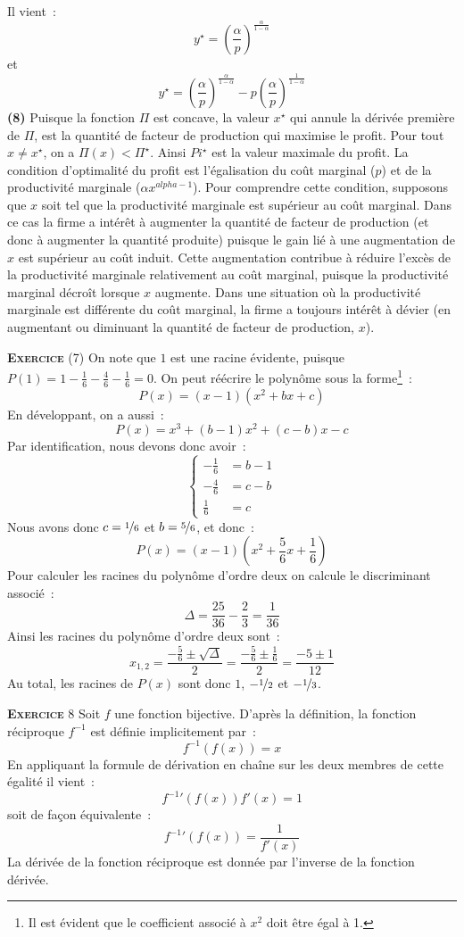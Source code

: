 \documentclass[10pt,a4paper,notitlepage]{article}
\newcommand{\exercice}[1]{\textsc{\textbf{Exercice}} #1}
\begin{document}
Il vient :
\[
y^{\star} = \left(\frac{\alpha}{p}\right)^{\frac{\alpha}{1-\alpha}}
\]
et
\[
y^{\star} = \left(\frac{\alpha}{p}\right)^{\frac{\alpha}{1-\alpha}}-p\left(\frac{\alpha}{p}\right)^{\frac{1}{1-\alpha}}
\]
\textbf{(8)} Puisque la fonction $\Pi$ est concave, la valeur
$x^{\star}$ qui annule la dérivée première de $\Pi$, est la quantité
de facteur de production qui maximise le profit. Pour tout $x\neq
x^{\star}$, on a $\Pi(x)<\Pi^{\star}$. Ainsi $Pi^{\star}$ est
la valeur maximale du profit. La condition d'optimalité du profit est
l'égalisation du coût marginal ($p$) et de la productivité marginale
($\alpha x^{alpha-1}$). Pour comprendre cette condition, supposons que
$x$ soit tel que la productivité marginale est supérieur au coût
marginal. Dans ce cas la firme a intérêt à augmenter la quantité de
facteur de production (et donc à augmenter la quantité produite)
puisque le gain lié à une augmentation de $x$ est supérieur au coût
induit. Cette augmentation contribue à réduire l'excès de la
productivité marginale relativement au coût marginal, puisque la
productivité marginal décroît lorsque $x$ augmente. Dans une situation
où la productivité marginale est différente du coût marginal, la firme
a toujours intérêt à dévier (en augmentant ou diminuant la quantité de
facteur de production, $x$).

\bigskip

\exercice{(7)} On note que $1$ est une racine évidente, puisque $P(1)=1-\frac{1}{6}-\frac{4}{6}-\frac{1}{6}=0$. On peut réécrire
le polynôme sous la forme\footnote{Il est évident que le coefficient
  associé à $x^2$ doit être égal à 1.} :
\[
P(x) = (x-1)(x^2+bx+c)
\]
En développant, on a aussi :
\[
P(x) = x^3 + (b-1)x^2 + (c-b)x - c
\]
Par identification, nous devons donc avoir :
\[
  \begin{cases}
    -\frac{1}{6} &= b-1\\
    -\frac{4}{6} &= c-b\\
    \frac{1}{6} &= c
  \end{cases}
\]
Nous avons donc $c =\nicefrac{1}{6}$ et $b=\nicefrac{5}{6}$, et
donc :
\[
P(x) = (x-1)\left(x^2+\frac{5}{6}x+\frac{1}{6}\right)
\]
Pour calculer les racines du polynôme d'ordre deux on calcule le
discriminant associé :
\[
\Delta = \frac{25}{36}-\frac{2}{3} = \frac{1}{36}
\]
Ainsi les racines du polynôme d'ordre deux sont :
\[
x_{1,2} = \frac{-\frac{5}{6} \pm\sqrt{\Delta}}{2} =
\frac{-\frac{5}{6}\pm \frac{1}{6}}{2} = 
\frac{-5 \pm 1}{12}
\]
Au total, les racines de $P(x)$ sont donc $1$, $-\nicefrac{1}{2}$ et
$-\nicefrac{1}{3}$.

\bigskip

\exercice{8} Soit $f$ une fonction bijective. D'après la définition,
la fonction réciproque $f^{-1}$ est définie implicitement par :
\[
f^{-1}(f(x)) = x
\]
En appliquant la formule de dérivation en chaîne sur les deux membres
de cette égalité il vient :
\[
\left. f^{-1} \right.' (f(x)) f'(x) = 1
\]
soit de façon équivalente :
\[
\left. f^{-1} \right.' (f(x)) = \frac{1}{f'(x)}
\]
La dérivée de la fonction réciproque est donnée par l'inverse de la
fonction dérivée.
\end{document}
